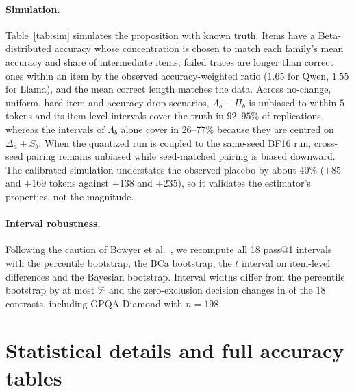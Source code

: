\documentclass[11pt,a4paper]{article}
\begin{document}
\paragraph{Simulation.} Table~\ref{tab:sim} simulates the proposition with known truth. Items have a Beta-distributed accuracy whose concentration is chosen to match each family's mean accuracy and share of intermediate items; failed traces are longer than correct ones within an item by the observed accuracy-weighted ratio ($1.65$ for Qwen, $1.55$ for Llama), and the mean correct length matches the data. Across no-change, uniform, hard-item and accuracy-drop scenarios, $\Lambda_b-\Pi_b$ is unbiased to within $5$ tokens and its item-level intervals cover the truth in $92$--$95\%$ of replications, whereas the intervals of $\Lambda_b$ alone cover in $26$--$77\%$ because they are centred on $\Delta_a+S_b$. When the quantized run is coupled to the same-seed BF16 run, cross-seed pairing remains unbiased while seed-matched pairing is biased downward. The calibrated simulation understates the observed placebo by about $40\%$ ($+85$ and $+169$ tokens against $+138$ and $+235$), so it validates the estimator's properties, not the magnitude.



\paragraph{Interval robustness.} Following the caution of Bowyer et al.~\cite{bowyer2025clt}, we recompute all 18 pass@1 intervals with the percentile bootstrap, the BCa bootstrap, the $t$ interval on item-level differences and the Bayesian bootstrap. Interval widths differ from the percentile bootstrap by at most \ciMaxWidthDev\% and the zero-exclusion decision changes in \ciDecisionChanges{} of the 18 contrasts, including GPQA-Diamond with $n=198$.

\section{Statistical details and full accuracy tables}
\label{app:stats}
\end{document}
